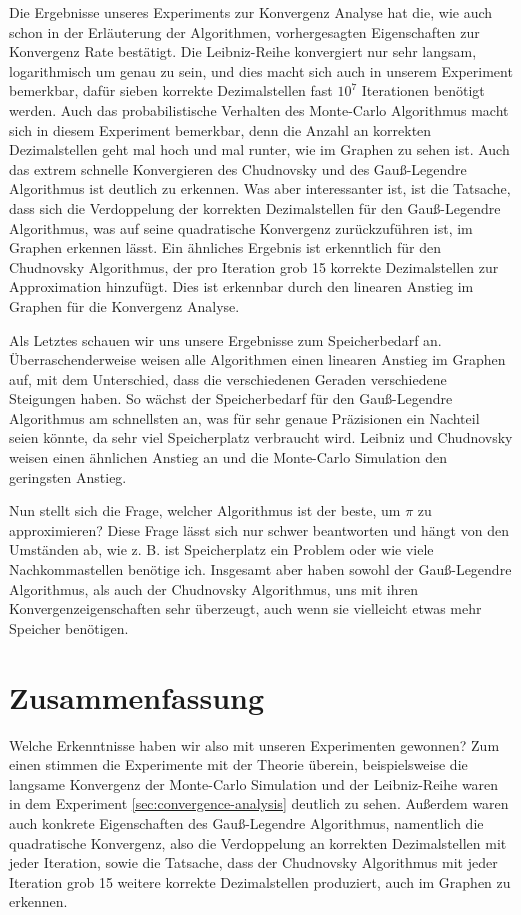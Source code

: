 \documentclass{scrartcl}
\theoremstyle{definition}
\newtheorem{approximation sequence}{Annäherungsfolge}
\begin{document}
Die Ergebnisse unseres Experiments zur Konvergenz Analyse hat die, wie auch
schon in der Erläuterung der Algorithmen, vorhergesagten Eigenschaften zur
Konvergenz Rate bestätigt. Die Leibniz-Reihe konvergiert nur sehr langsam,
logarithmisch um genau zu sein, und dies macht sich auch in unserem Experiment
bemerkbar, dafür sieben korrekte Dezimalstellen fast \(10^7\) Iterationen
benötigt werden. Auch das probabilistische Verhalten des Monte-Carlo
Algorithmus macht sich in diesem Experiment bemerkbar, denn die Anzahl an
korrekten Dezimalstellen geht mal hoch und mal runter, wie im Graphen zu sehen
ist. Auch das extrem schnelle Konvergieren des Chudnovsky und des Gauß-Legendre
Algorithmus ist deutlich zu erkennen. Was aber interessanter ist, ist die
Tatsache, dass sich die Verdoppelung der korrekten Dezimalstellen für den
Gauß-Legendre Algorithmus, was auf seine quadratische Konvergenz zurückzuführen
ist, im Graphen erkennen lässt. Ein ähnliches Ergebnis ist erkenntlich für den
Chudnovsky Algorithmus, der pro Iteration grob 15 korrekte Dezimalstellen zur
Approximation hinzufügt. Dies ist erkennbar durch den linearen Anstieg im
Graphen für die Konvergenz Analyse.

Als Letztes schauen wir uns unsere Ergebnisse zum Speicherbedarf an.
Überraschenderweise weisen alle Algorithmen einen linearen Anstieg im Graphen
auf, mit dem Unterschied, dass die verschiedenen Geraden verschiedene
Steigungen haben. So wächst der Speicherbedarf für den Gauß-Legendre
Algorithmus am schnellsten an, was für sehr genaue Präzisionen ein Nachteil
seien könnte, da sehr viel Speicherplatz verbraucht wird. Leibniz und
Chudnovsky weisen einen ähnlichen Anstieg an und die Monte-Carlo Simulation den
geringsten Anstieg.

Nun stellt sich die Frage, welcher Algorithmus ist der beste, um \(\pi\) zu
approximieren? Diese Frage lässt sich nur schwer beantworten und hängt von den
Umständen ab, wie z. B. ist Speicherplatz ein Problem oder wie viele
Nachkommastellen benötige ich. Insgesamt aber haben sowohl der Gauß-Legendre
Algorithmus, als auch der Chudnovsky Algorithmus, uns mit ihren
Konvergenzeigenschaften sehr überzeugt, auch wenn sie vielleicht etwas mehr
Speicher benötigen.

\section{Zusammenfassung}

Welche Erkenntnisse haben wir also mit unseren Experimenten gewonnen? Zum einen
stimmen die Experimente mit der Theorie überein, beispielsweise die langsame
Konvergenz der Monte-Carlo Simulation und der Leibniz-Reihe waren in dem
Experiment \autoref{sec:convergence-analysis} deutlich zu sehen. Außerdem waren
auch konkrete Eigenschaften des Gauß-Legendre Algorithmus, namentlich die
quadratische Konvergenz, also die Verdoppelung an korrekten Dezimalstellen mit
jeder Iteration, sowie die Tatsache, dass der Chudnovsky Algorithmus mit jeder
Iteration grob 15 weitere korrekte Dezimalstellen produziert, auch im Graphen
zu erkennen.
\end{document}
